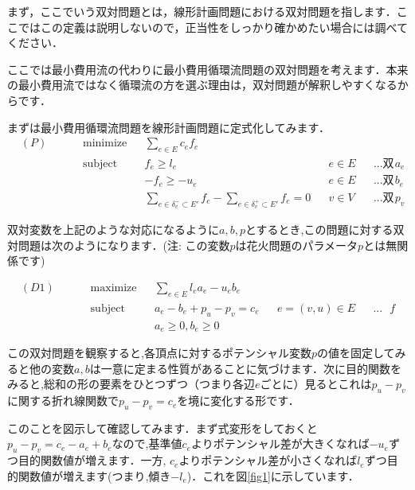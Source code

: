 \documentclass[13pt]{jarticle}
\theoremstyle{nonitalic} %
\begin{document}
まず，ここでいう双対問題とは，線形計画問題における双対問題を指します．ここではこの定義は説明しないので，正当性をしっかり確かめたい場合には調べてください．

ここでは最小費用流の代わりに最小費用循環流問題の双対問題を考えます．本来の最小費用流ではなく循環流の方を選ぶ理由は，双対問題が解釈しやすくなるからです．

まずは最小費用循環流問題を線形計画問題に定式化してみます．
\begin{align}
 &(P)&&&&\textrm{minimize}   && \sum_{e\in E} c_e f_e  \\
 &&&&&\textrm{subject to} && f_{e} \geq l_e & &e  \in E && \textrm{...双対変数$a_e$} \\
 &&&&& && -f_{e} \geq -u_e && e \in E && \textrm{...双対変数$b_e$}\\
 &&&&&                    && \sum_{e \in \delta_v^-  \subset E'} f_e - \sum_{e \in \delta_v^+  \subset E'} f_e= 0 && v \in V && \textrm{...双対変数$p_v$} &&&&& 
\end{align}

双対変数を上記のような対応になるように$a,b,p$とするとき,この問題に対する双対問題は次のようになります．(注: この変数$p$は花火問題のパラメータ$p$とは無関係です)

\begin{align}
&(D1)&&&&\textrm{maximize}   && \sum_{e\in E} l_e a_e - u_e b_e  \\
&&&&&\textrm{subject to} && a_e - b_e + p_u - p_v = c_e && e = (v,u) \in E  && \textrm{...主変数$f$}& \\
&&&&& && a_e \geq 0, b_e \geq 0 &&&&&&&&
\end{align}

この双対問題を観察すると,各頂点に対するポテンシャル変数$p$の値を固定してみると他の変数$a,b$は一意に定まる性質があることに気づけます．次に目的関数をみると,総和の形の要素をひとつずつ（つまり各辺$e$ごとに）見るとこれは$p_u-p_v$に関する折れ線関数で$p_u-p_v=c_e$を境に変化する形です．

このことを図示して確認してみます．まず式変形をしておくと$p_u-p_v = c_e - a_e + b_e$なので,基準値$c_e$よりポテンシャル差が大きくなれば$-u_e$ずつ目的関数値が増えます．一方, $c_e$よりポテンシャル差が小さくなれば$l_e$ずつ目的関数値が増えます(つまり,傾き$-l_e$)．これを図\ref{fig1}に示しています． 
\end{document}
